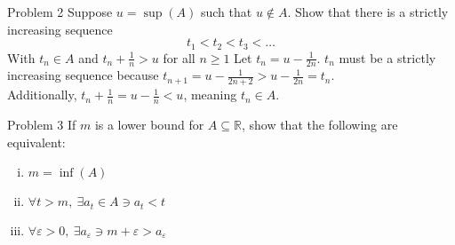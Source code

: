 \documentclass[8pt]{extarticle}
\newcommand{\R}{\mathbb{R}}
\begin{document}
  \begin{problem}{Problem 2}
    Suppose $u = \sup(A)$ such that $u\notin A$. Show that there is a strictly increasing sequence
    \[
      t_1 < t_2 < t_3 < \dots
    \] 
    With $t_n \in A$ and $t_n + \frac{1}{n} > u$ for all $n \geq 1$
    \tcblower
    Let $t_n = u-\frac{1}{2n}$. $t_n$ must be a strictly increasing sequence because $t_{n+1} = u - \frac{1}{2n+2} > u-\frac{1}{2n} = t_n$.\\

    Additionally, $t_n + \frac{1}{n} = u-\frac{1}{n} < u$, meaning $t_n\in A$.
  \end{problem}
  \begin{problem}{Problem 3}
    If $m$ is a lower bound for $A\subseteq \R$, show that the following are equivalent:
    \begin{enumerate}[(i)]
      \item $m = \inf(A)$
      \item $\forall t > m,~\exists a_t\in A \ni a_t < t$
      \item $\forall \varepsilon > 0,~\exists a_{\varepsilon} \ni m+\varepsilon > a_{\varepsilon}$
    \end{enumerate}
  \end{problem}
\end{document}
